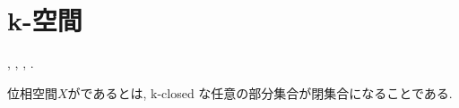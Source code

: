 \documentclass[uplatex, dvipdfmx, a4paper, 12pt, class=jsbook, crop=false]{standalone}
\begin{document}
\section{k-空間}
\label{sec:k-spaces}

\begin{source}
	\cite[Section 7.9]{Dieck2008AT},
	\cite{Strickland2009CGWH},
	\cite{Rezk2017CGS},
	\cite{Rezk0000K}.
\end{source}

\begin{definition}
	位相空間$X$がであるとは,
	k-closed な任意の部分集合が閉集合になることである.
\end{definition}
\end{document}
